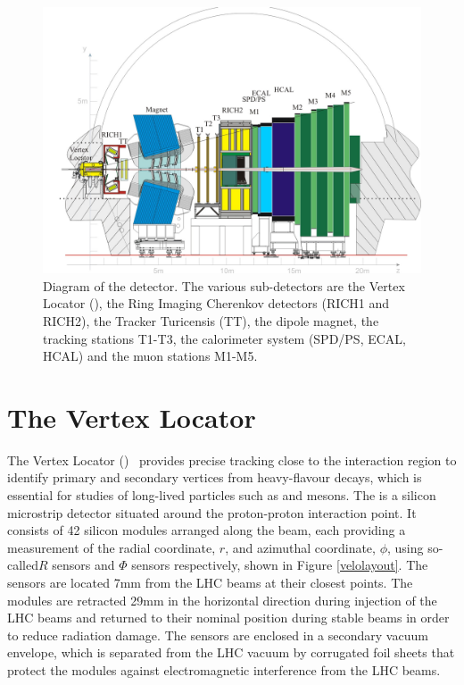 \begin{figure}
\includegraphics[width=\linewidth]{figures/detector/lhcb.pdf}
\caption{Diagram of the \lhcb detector. The various sub-detectors are the Vertex Locator (\velo), the Ring Imaging Cherenkov detectors (RICH1 and RICH2), the Tracker Turicensis (TT), the dipole magnet, the tracking stations T1-T3, the calorimeter system (SPD/PS, ECAL, HCAL) and the muon stations M1-M5.}
\label{lhcbdetector}
\end{figure}

\section{The Vertex Locator}
\label{sec:detector:velo}

The Vertex Locator (\velo)~\cite{LHCb-DP-2014-001} provides precise tracking close to the \lhcb interaction region to identify primary and secondary vertices from heavy-flavour decays, which is essential for studies of long-lived particles such as \B and \D mesons. The \velo is a silicon microstrip detector situated around the proton-proton interaction point. It consists of 42 silicon modules arranged along the beam, each providing a measurement of the radial coordinate, $r$, and azimuthal coordinate, $\phi$, using so-called$R$ sensors and $\Phi$ sensors respectively, shown in Figure \ref{velolayout}. The sensors are located 7mm from the LHC beams at their closest points. The \velo modules are retracted 29mm in the horizontal direction during injection of the LHC beams and returned to their nominal position during stable beams in order to reduce radiation damage. The sensors are enclosed in a secondary vacuum envelope, which is separated from the LHC vacuum by corrugated foil sheets that protect the \velo modules against electromagnetic interference from the LHC beams.

